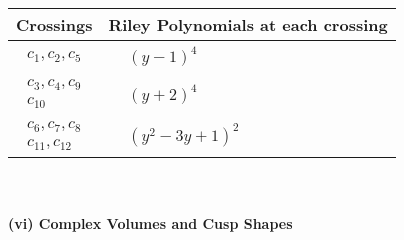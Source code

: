 \documentclass[1p]{elsarticle_modified}
\theoremstyle{definition}
\begin{document}
\begin{tabular}{m{50pt}|m{274pt}}
Crossings & \hspace{64pt}Riley Polynomials at each crossing \\
\hline $$\begin{aligned}c_{1},c_{2},c_{5}\end{aligned}$$&$\begin{aligned}
&(y-1)^4
\end{aligned}$\\
\hline $$\begin{aligned}c_{3},c_{4},c_{9}\\c_{10}\end{aligned}$$&$\begin{aligned}
&(y+2)^4
\end{aligned}$\\
\hline $$\begin{aligned}c_{6},c_{7},c_{8}\\c_{11},c_{12}\end{aligned}$$&$\begin{aligned}
&(y^2-3 y+1)^2
\end{aligned}$\\
\hline
\end{tabular}\\~\\
\newpage\flushleft \textbf{(vi) Complex Volumes and Cusp Shapes}
\end{document}
